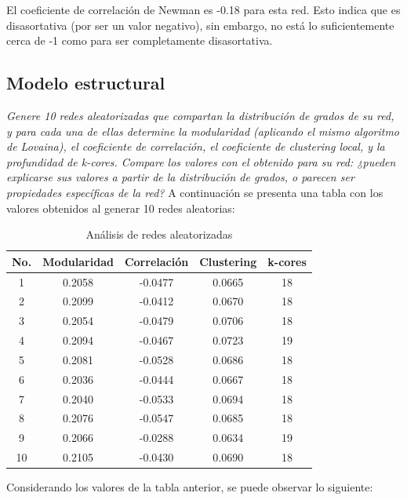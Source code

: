 \documentclass[12pt]{article}
\begin{document}
El coeficiente de correlación de Newman es -0.18 para esta red. Esto indica que es disasortativa (por ser un valor negativo), sin embargo, no está lo suficientemente cerca de -1 como para ser completamente disasortativa.

\subsection{Modelo estructural} 
\textit{Genere 10 redes aleatorizadas que compartan la distribución de grados de su red, y para cada una de ellas determine la modularidad (aplicando el mismo algoritmo de Lovaina), el coeficiente de correlación, el coeficiente de clustering local, y la profundidad de k-cores. Compare los valores con el obtenido para su red: ¿pueden explicarse sus valores a partir de la distribución de grados, o parecen ser propiedades específicas de la red?}
A continuación se presenta una tabla con los valores obtenidos al generar 10 redes aleatorias:
\begin{table}[H]
    \centering
    \begin{tabular}{|c|c|c|c|c|}
        \hline
        No. & Modularidad & Correlación & Clustering & k-cores \\
        \hline
        1  & 0.2058 & -0.0477 & 0.0665 & 18 \\
        2  & 0.2099 & -0.0412 & 0.0670 & 18 \\
        3  & 0.2054 & -0.0479 & 0.0706 & 18 \\
        4  & 0.2094 & -0.0467 & 0.0723 & 19 \\
        5  & 0.2081 & -0.0528 & 0.0686 & 18 \\
        6  & 0.2036 & -0.0444 & 0.0667 & 18 \\
        7  & 0.2040 & -0.0533 & 0.0694 & 18 \\
        8  & 0.2076 & -0.0547 & 0.0685 & 18 \\
        9  & 0.2066 & -0.0288 & 0.0634 & 19 \\
        10 & 0.2105 & -0.0430 & 0.0690 & 18 \\
        \hline
    \end{tabular}
    \caption{Análisis de redes aleatorizadas}
    \label{tab:redes_aleatorizadas}
\end{table}
Considerando los valores de la tabla anterior, se puede observar lo siguiente:
\end{document}
